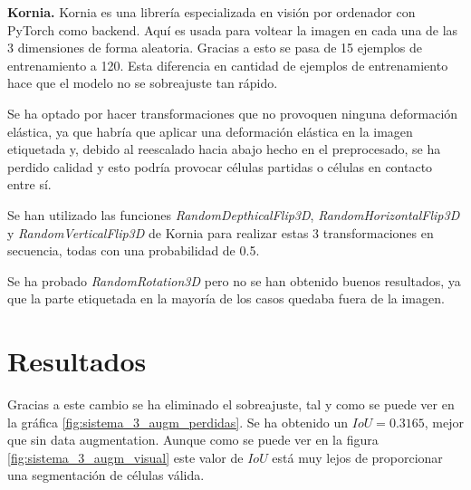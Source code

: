 \textbf{Kornia.} Kornia \cite{ERiba2020} es una librería especializada en visión por ordenador con PyTorch como backend. Aquí es usada para voltear la imagen en cada una de las 3 dimensiones de forma aleatoria. Gracias a esto se pasa de 15 ejemplos de entrenamiento a 120. Esta diferencia en cantidad de ejemplos de entrenamiento hace que el modelo no se sobreajuste tan rápido.

Se ha optado por hacer transformaciones que no provoquen ninguna deformación elástica, ya que habría que aplicar una deformación elástica en la imagen etiquetada y, debido al reescalado hacia abajo hecho en el preprocesado, se ha perdido calidad y esto podría provocar células partidas o células en contacto entre sí.

Se han utilizado las funciones \textit{RandomDepthicalFlip3D}, \textit{RandomHorizontalFlip3D} y \textit{RandomVerticalFlip3D} de Kornia para realizar estas 3 transformaciones en secuencia, todas con una probabilidad de 0.5.

Se ha probado \textit{RandomRotation3D} pero no se han obtenido buenos resultados, ya que la parte etiquetada en la mayoría de los casos quedaba fuera de la imagen.

\section{Resultados}\label{sec:data_augmentation_resultados}




Gracias a este cambio se ha eliminado el sobreajuste, tal y como se puede ver en la gráfica \ref{fig:sistema_3_augm_perdidas}. Se ha obtenido un $IoU=0.3165$, mejor que sin data augmentation. Aunque como se puede ver en la figura \ref{fig:sistema_3_augm_visual} este valor de $IoU$ está muy lejos de proporcionar una segmentación de células válida.